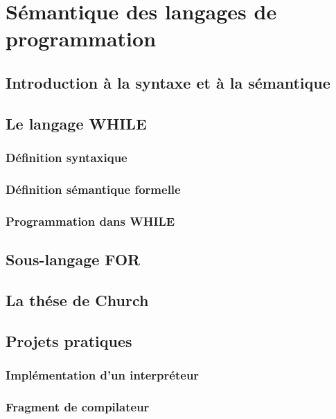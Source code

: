 \chapter{S\'emantique des langages de programmation}\label{chap:semantique}
  \section{Introduction \`a la syntaxe et \`a la s\'emantique}\label{sec:intro_syntaxe_semantique}
  \section{Le langage WHILE}\label{sec:langage_while}
    \subsection{D\'efinition syntaxique}\label{subsec:syntaxe_while}
    \subsection{D\'efinition s\'emantique formelle}\label{subsec:semantique_formelle}
    \subsection{Programmation dans WHILE}\label{subsec:programmation_while}
  \section{Sous-langage FOR}\label{sec:sous_langage_for}
  \section{La th\'ese de Church}\label{sec:these_church}
  \section{Projets pratiques}\label{sec:projets_pratiques}
    \subsection{Impl\'ementation d'un interpr\'eteur}\label{subsec:interprete}
    \subsection{Fragment de compilateur}\label{subsec:compilateur}
